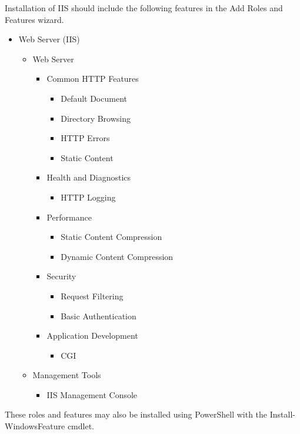 \documentclass{book}
\renewcommand{\,}{\kern0.2ex}
\begin{document}
	Installation of IIS should include the following features in the Add Roles and Features wizard.
	\begin{itemize}[label=$\to$]
		\item Web Server (IIS)
		\begin{itemize}[label=$\to$]
			\item Web Server
			\begin{itemize}[label=$\to$]
				\item Common HTTP Features
				\begin{itemize}[label=$\to$]
					\item Default Document
					\item Directory Browsing
					\item HTTP Errors
					\item Static Content
				\end{itemize}
				\item Health and Diagnostics
				\begin{itemize}[label=$\to$]
					\item HTTP Log{}ging
				\end{itemize}
				\item Performance
				\begin{itemize}[label=$\to$]
					\item Static Content Compression
					\item Dynamic Content Compression
				\end{itemize}
				\item Security
				\begin{itemize}[label=$\to$]
					\item Request Filtering
					\item Basic Authentication
				\end{itemize}
				\item Application Development
				\begin{itemize}[label=$\to$]
					\item CGI
				\end{itemize}
			\end{itemize}
			\item Management Tools
			\begin{itemize}[label=$\to$]
				\item IIS Management Console
			\end{itemize}
		\end{itemize}
	\end{itemize}

	These roles and features may also be installed using PowerShell with the {\ttfamily Install-Win\-d\-owsFea\-t\-ure} cmdlet.
	
\end{document}
